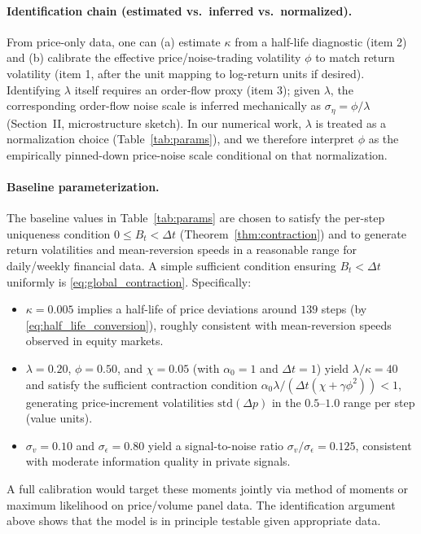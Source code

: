 \paragraph{Identification chain (estimated vs.\ inferred vs.\ normalized).}
From price-only data, one can (a) estimate $\kappa$ from a half-life diagnostic (item 2) and (b) calibrate the effective price/noise-trading volatility $\phi$ to match return volatility (item 1, after the unit mapping to log-return units if desired).
Identifying $\lambda$ itself requires an order-flow proxy (item 3); given $\lambda$, the corresponding order-flow noise scale is inferred mechanically as $\sigma_\eta=\phi/\lambda$ (Section~II, microstructure sketch).
In our numerical work, $\lambda$ is treated as a normalization choice (Table~\ref{tab:params}), and we therefore interpret $\phi$ as the empirically pinned-down price-noise scale conditional on that normalization.

\paragraph{Baseline parameterization.}
The baseline values in Table~\ref{tab:params} are chosen to satisfy the per-step uniqueness condition $0\le B_t<\Delta t$ (Theorem~\ref{thm:contraction}) and to generate return volatilities and mean-reversion speeds in a reasonable range for daily/weekly financial data. A simple sufficient condition ensuring $B_t<\Delta t$ uniformly is \eqref{eq:global_contraction}. Specifically:
\begin{itemize}
\item $\kappa=0.005$ implies a half-life of price deviations around $139$ steps (by \eqref{eq:half_life_conversion}), roughly consistent with mean-reversion speeds observed in equity markets.
\item $\lambda=0.20$, $\phi=0.50$, and $\chi=0.05$ (with $\alpha_0=1$ and $\Delta t=1$) yield $\lambda/\kappa=40$ and satisfy the sufficient contraction condition $\alpha_0\lambda/(\Delta t(\chi+\gamma\phi^2))<1$, generating price-increment volatilities $\mathrm{std}(\Delta p)$ in the $0.5$--$1.0$ range per step (value units).
\item $\sigma_v=0.10$ and $\sigma_\epsilon=0.80$ yield a signal-to-noise ratio $\sigma_v/\sigma_\epsilon=0.125$, consistent with moderate information quality in private signals.
\end{itemize}

A full calibration would target these moments jointly via method of moments or maximum likelihood on price/volume panel data. The identification argument above shows that the model is in principle testable given appropriate data.

